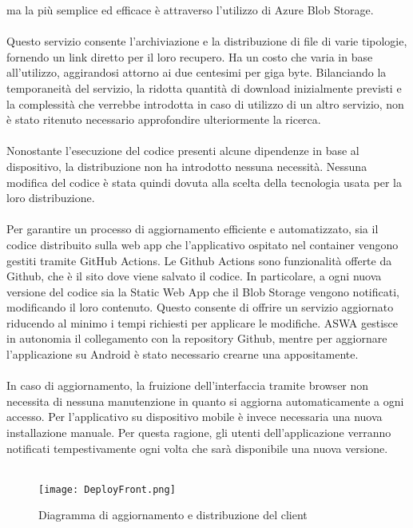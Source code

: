 ma la più semplice ed efficace è attraverso l'utilizzo di Azure Blob Storage.\\
\\
Questo servizio consente l'archiviazione e la distribuzione di file di varie tipologie,
fornendo un link diretto per il loro recupero.
Ha un costo che varia in base all'utilizzo,
aggirandosi attorno ai due centesimi per giga byte.
Bilanciando la temporaneità del servizio,
la ridotta quantità di download inizialmente previsti e
la complessità che verrebbe introdotta in caso di utilizzo di un altro servizio,
non è stato ritenuto necessario approfondire ulteriormente la ricerca.\\
\\
Nonostante l'esecuzione del codice presenti alcune dipendenze in base al dispositivo,
la distribuzione non ha introdotto nessuna necessità.
Nessuna modifica del codice è stata quindi dovuta alla scelta della tecnologia usata per
la loro distribuzione.\\
\\
Per garantire un processo di aggiornamento efficiente e automatizzato,
sia il codice distribuito sulla web app che l'applicativo ospitato nel container
vengono gestiti tramite GitHub Actions.
Le Github Actions sono funzionalità offerte da Github,
che è il sito dove viene salvato il codice.
In particolare, a ogni nuova versione del codice sia la Static Web App che il Blob Storage vengono notificati,
modificando il loro contenuto.
Questo consente di offrire un servizio aggiornato
riducendo al minimo i tempi richiesti per applicare le modifiche.
ASWA gestisce in autonomia il collegamento con la repository Github,
mentre per aggiornare l'applicazione su Android è stato necessario crearne una appositamente.\\
\\
In caso di aggiornamento,
la fruizione dell'interfaccia tramite browser non necessita di nessuna manutenzione
in quanto si aggiorna automaticamente a ogni accesso.
Per l'applicativo su dispositivo mobile è invece necessaria una nuova installazione manuale.
Per questa ragione, gli utenti dell'applicazione verranno notificati tempestivamente
ogni volta che sarà disponibile una nuova versione.\\
\\

\begin{figure}[htbp]
    \begin{center}
        \texttt{[image: DeployFront.png]}
        \caption{Diagramma di aggiornamento e distribuzione del client}
    \end{center}
\end{figure}
\clearpage
